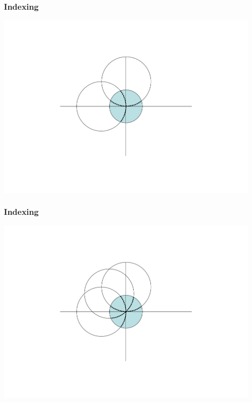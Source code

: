 \documentclass[slides,compress]{beamer}
\begin{document}
\begin{frame}
\frametitle{Indexing}
\hspace{6cm}
\includegraphics[scale=0.5]{figures/Ewald2Image.pdf}
\end{frame}

\begin{frame}
\frametitle{Indexing}
\hspace{6cm}
\includegraphics[scale=0.5]{figures/Ewald3Image.pdf}
\end{frame}
\end{document}
